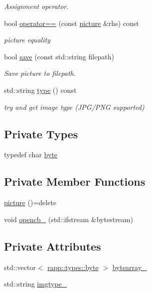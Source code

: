 \begin{DoxyCompactItemize}
\begin{DoxyCompactList}\small\item\em Assignment operator. \end{DoxyCompactList}\item 
bool \hyperlink{classrapp_1_1object_1_1picture_aad6e18da0e6be9ad7d195ee34b79bf2c}{operator==} (const \hyperlink{classrapp_1_1object_1_1picture}{picture} \&rhs) const 
\begin{DoxyCompactList}\small\item\em picture equality \end{DoxyCompactList}\item 
bool \hyperlink{classrapp_1_1object_1_1picture_afc2c1e50bd6192da8ee1588e3969a669}{save} (const std\-::string filepath)
\begin{DoxyCompactList}\small\item\em Save picture to filepath. \end{DoxyCompactList}\item 
std\-::string \hyperlink{classrapp_1_1object_1_1picture_a2045be9835aca3deac8c36e0552008ab}{type} () const 
\begin{DoxyCompactList}\small\item\em try and get image type (J\-P\-G/\-P\-N\-G supported) \end{DoxyCompactList}\end{DoxyCompactItemize}
\subsection*{Private Types}
\begin{DoxyCompactItemize}
\item 
typedef char \hyperlink{classrapp_1_1object_1_1picture_abbc28aad3c22d1d47fa423ffb3e55b61}{byte}
\end{DoxyCompactItemize}
\subsection*{Private Member Functions}
\begin{DoxyCompactItemize}
\item 
\hyperlink{classrapp_1_1object_1_1picture_a4edfc5d343a51a181c743d76d18c10f9}{picture} ()=delete
\item 
void \hyperlink{classrapp_1_1object_1_1picture_a7f767113dc2aca7c5be7ec58704cb5c8}{opencb\-\_\-} (std\-::ifstream \&bytestream)
\end{DoxyCompactItemize}
\subsection*{Private Attributes}
\begin{DoxyCompactItemize}
\item 
std\-::vector$<$ \hyperlink{namespacerapp_1_1types_a1dbc9dc2ab4507d8fb58ac3a204d307b}{rapp\-::types\-::byte} $>$ \hyperlink{classrapp_1_1object_1_1picture_a4c6377918f2286dbbe320cd9a1d8767c}{bytearray\-\_\-}
\item 
std\-::string \hyperlink{classrapp_1_1object_1_1picture_abd57377c1e24ac9bfeda846bb3076aae}{imgtype\-\_\-}
\end{DoxyCompactItemize}


